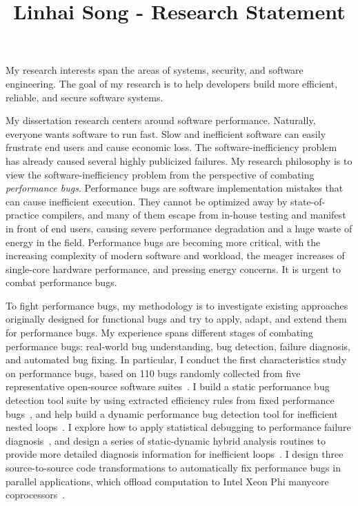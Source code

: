 \documentclass[10pt]{article}
\title{\vspace{-.7in}\bf{Linhai Song - Research Statement\vspace{-.4in}}}
\date{}
\begin{document}
\maketitle\vspace{-.2in}

My research interests span the areas of systems, security, and software engineering.
The goal of my research is to help developers build more efficient, reliable, and secure software systems.

My dissertation research centers around software performance. 
Naturally, everyone wants software to run fast. 
Slow and inefficient software can easily frustrate end users and cause economic loss. 
The software-inefficiency problem has already caused several highly publicized failures. 
My research philosophy is to view the software-inefficiency problem from the perspective of combating \textit{performance bugs}.
Performance bugs are software implementation mistakes that can cause inefficient execution. 
They cannot be optimized away by state-of-practice compilers,
and many of them escape from in-house testing and manifest in front of end users, 
causing severe performance degradation and a huge waste of energy in the field. 
Performance bugs are becoming more critical, with the increasing complexity of modern software and workload, 
the meager increases of single-core hardware performance, 
and pressing energy concerns. 
It is urgent to combat performance bugs.

To fight performance bugs, my methodology is to investigate existing approaches originally
designed for functional bugs and try to apply, adapt, and extend them
for performance bugs.
My experience spans different
stages of combating performance bugs: real-world bug understanding, bug detection,
failure diagnosis, and automated bug fixing.
In particular, I conduct the first characteristics study on performance bugs, based on 110 bugs 
randomly collected from five representative open-source software suites~\cite{jin12perfbug}.
I build a static performance bug detection tool suite by using extracted efficiency rules from fixed performance bugs~\cite{jin12perfbug}, 
and help build a dynamic performance bug detection tool for inefficient nested loops~\cite{Nistor13ICSE}. 
I explore how to apply statistical debugging to performance failure diagnosis~\cite{Song14OOPSLA}, 
and design a series of static-dynamic hybrid analysis routines to provide more detailed diagnosis information for inefficient loops~\cite{Song17ICSE}.
I design three source-to-source code transformations to automatically fix performance bugs in 
parallel applications, which offload computation to Intel Xeon Phi manycore coprocessors~\cite{Song14MICRO}. 
\end{document}
